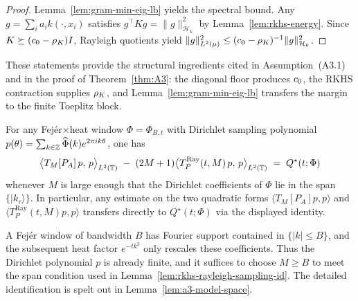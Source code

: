 \begin{proof}
Lemma~\ref{lem:gram-min-eig-lb} yields the spectral bound. Any $g=\sum_i a_i k(\cdot,x_i)$ satisfies $g^\top K g = \|g\|_{\mathcal H_k}^2$ by Lemma~\ref{lem:rkhs-energy}. Since $K\succeq (c_0-\rho_K) I$, Rayleigh quotients yield $\|g\|_{L^2(\mu)}^2 \le (c_0-\rho_K)^{-1}\|g\|_{\mathcal H_k}^2$.
\end{proof}

These statements provide the structural ingredients cited in Assumption~(A3.1) and in the proof of Theorem~\ref{thm:A3}: the diagonal floor produces $c_0$, the RKHS contraction supplies $\rho_K$, and Lemma~\ref{lem:gram-min-eig-lb} transfers the margin to the finite Toeplitz block.

\begin{lemma}\label{lem:rkhs-rayleigh-sampling-id}
For any Fej\'er$\times$heat window $\Phi=\Phi_{B,t}$ with Dirichlet sampling polynomial $p(\theta)=\sum_{k\in\mathbb Z}\widehat\Phi(k)e^{2\pi i k\theta}$, one has
\[
  \big\langle T_M[P_A]\,p,\,p\big\rangle_{L^2(\mathbb T)}
  \;-\; (2M+1)\big\langle T_P^{\mathrm{Ray}}(t,M)\,p,\,p\big\rangle_{L^2(\mathbb T)}
  \;=\; Q^\star(t;\Phi)
\]
whenever $M$ is large enough that the Dirichlet coefficients of $\Phi$ lie in the span $\{|k_\tau\rangle\}$. In particular, any estimate on the two quadratic forms
$\langle T_M[P_A]p,p\rangle$ and $\langle T_P^{\mathrm{Ray}}(t,M)p,p\rangle$ transfers directly to $Q^\star(t;\Phi)$ via the displayed identity.
\end{lemma}

\begin{remark}
A Fej\'er window of bandwidth $B$ has Fourier support contained in $\{|k|\le B\}$, and the subsequent heat factor $e^{-t k^2}$ only rescales these coefficients. Thus the Dirichlet polynomial $p$ is already finite, and it suffices to choose $M\ge B$ to meet the span condition used in Lemma~\ref{lem:rkhs-rayleigh-sampling-id}. The detailed identification is spelt out in Lemma~\ref{lem:a3-model-space}.
\end{remark}
